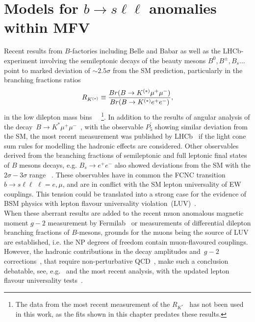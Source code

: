 
\chapter{Models for $b \to s \ell \ell$ anomalies within MFV}\label{chap:flav}
Recent results from $B$-factories including Belle and Babar as well as the LHCb-experiment involving the semileptonic decays of the beauty mesons $B^0, B^\pm,B_s \dots$ point to marked deviation of $ \sim 2.5 \sigma$ from the SM prediction, particularly in the branching fractions ratios
\begin{equation}
R_{K^{(*)}} \equiv {Br(B \to K^{(*)} \mu^{+} \mu^{-}) \over Br(B \to K^{(*)} e^{+} e^{-})},
\end{equation}
in the low dilepton mass bins ~\cite{Aaij:2014ora,Aaij:2017vbb,Aaij:2019wad,Abdesselam:2019wac,LHCb:2021trn}~\footnote{The data from the most recent measurement of the $R_{K^*}$~\cite{LHCb:2021trn} has not been used in this work, as the fits shown in this chapter predates these results.}. In addition to the results of angular analysis of the decay~$B \to K^{*} \mu^{+} \mu^{-}$~\cite{Descotes-Genon:2013wba,Descotes-Genon:2015uva}, with the observable $P_5^\prime$  showing similar deviation from the SM, the most recent measurement was published by LHCb~\cite{LHCb:2020lmf} if the light cone sum rules for modelling  the hadronic effects are considered. Other observables derived from the branching fractions of semileptonic and full leptonic final states of $B$ mesons decays, e.g. $ B_{s} \to e^{+} e^{-}$ also showed deviations from the SM with the $2\sigma-3\sigma$ range ~\cite{Chatrchyan:2013bka,Aaij:2017vad,Aaboud:2018mst,Aaij:2020nol}. These observables have in common the FCNC transition $ b \to s \ell \ell\, \, \ell = e, \mu$, and are in conflict with the SM lepton universality of EW couplings. This tension could be translated into a strong case for the evidence of BSM physics with lepton flavour universality violation~(LUV)~\cite{Hiller:2014yaa,Hiller:2014ula,Bordone:2016gaq}.\\
When these aberrant results are added to the recent muon anomalous magnetic moment $g-2$ measurement by Fermilab~\cite{Muong-2:2021ojo} or measurements of differential dilepton branching fractions of $B$-mesons,  grounds for the muons being the source of LUV are established, i.e.  the NP degrees of freedom contain muon-flavoured couplings.  However, the hadronic contributions  in the decay amplitudes and~$g-2$ corrections~\cite{Khodjamirian:2010vf,Lyon:2014hpa,Chobanova:2017ghn,Blake:2017fyh,Bobeth:2017vxj}, that require non-perturbative QCD~\cite{Jager:2014rwa,Ciuchini:2015qxb,Arbey:2018ics,Chrzaszcz:2018yza}, make such a conclusion debatable, see, e.g.~\cite{Ciuchini:2018anp,Hurth:2020rzx} and the most recent analysis, with the updated lepton flavour universality tests~\cite{Ciuchini:2021smi}. \\
